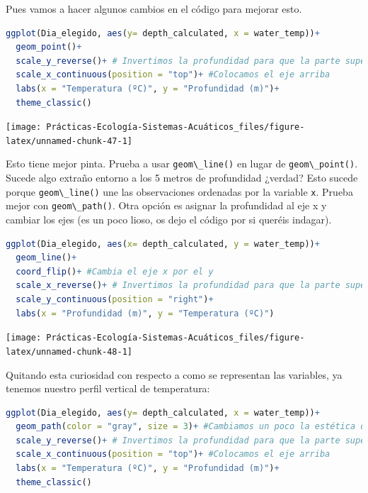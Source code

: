 \documentclass[
]{book}
\newcommand{\passthrough}[1]{#1}
\begin{document}
Pues vamos a hacer algunos cambios en el código para mejorar esto.

\begin{lstlisting}[language=R]
ggplot(Dia_elegido, aes(y= depth_calculated, x = water_temp))+
  geom_point()+
  scale_y_reverse()+ # Invertimos la profundidad para que la parte superior sea 0 metros.
  scale_x_continuous(position = "top")+ #Colocamos el eje arriba
  labs(x = "Temperatura (ºC)", y = "Profundidad (m)")+
  theme_classic()
\end{lstlisting}

\texttt{[image: Prácticas-Ecología-Sistemas-Acuáticos\_files/figure-latex/unnamed-chunk-47-1]}

Esto tiene mejor pinta. Prueba a usar \passthrough{\lstinline!geom\_line()!} en lugar de \passthrough{\lstinline!geom\_point()!}. Sucede algo extraño entorno a los 5 metros de profundidad ¿verdad? Esto sucede porque \passthrough{\lstinline!geom\_line()!} une las observaciones ordenadas por la variable \passthrough{\lstinline!x!}. Prueba mejor con \passthrough{\lstinline!geom\_path()!}. Otra opción es asignar la profundidad al eje x y cambiar los ejes (es un poco lioso, os dejo el código por si queréis indagar).

\begin{lstlisting}[language=R]
ggplot(Dia_elegido, aes(x= depth_calculated, y = water_temp))+
  geom_line()+
  coord_flip()+ #Cambia el eje x por el y
  scale_x_reverse()+ # Invertimos la profundidad para que la parte superior sea 0 metros.
  scale_y_continuous(position = "right")+
  labs(x = "Profundidad (m)", y = "Temperatura (ºC)")
\end{lstlisting}

\texttt{[image: Prácticas-Ecología-Sistemas-Acuáticos\_files/figure-latex/unnamed-chunk-48-1]}

Quitando esta curiosidad con respecto a como se representan las variables, ya tenemos nuestro perfil vertical de temperatura:

\begin{lstlisting}[language=R]
ggplot(Dia_elegido, aes(y= depth_calculated, x = water_temp))+
  geom_path(color = "gray", size = 3)+ #Cambiamos un poco la estética dándole color y grosor a la línea
  scale_y_reverse()+ # Invertimos la profundidad para que la parte superior sea 0 metros.
  scale_x_continuous(position = "top")+ #Colocamos el eje arriba
  labs(x = "Temperatura (ºC)", y = "Profundidad (m)")+
  theme_classic()
\end{lstlisting}
\end{document}
